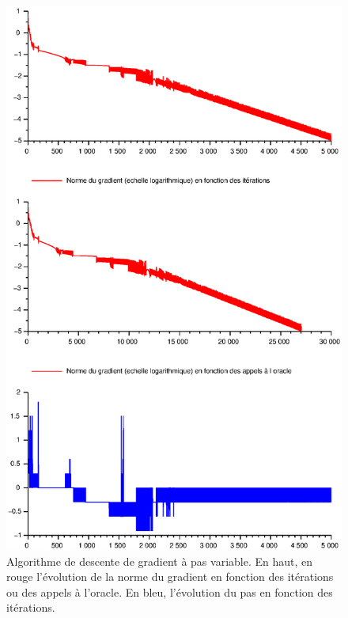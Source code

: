 \documentclass[11pt]{article}
\begin{document}
\begin{figure}[H]
  \centering
    \includegraphics[width=0.95 \textwidth]{Images/Lagrange_pas_vari.eps}
  \caption{Algorithme de descente de gradient à pas variable. En haut, en rouge l'évolution de la norme du gradient en fonction des itérations ou des appels à l'oracle. En bleu, l'évolution du pas en fonction des itérations.}
\end{figure}
\end{document}
